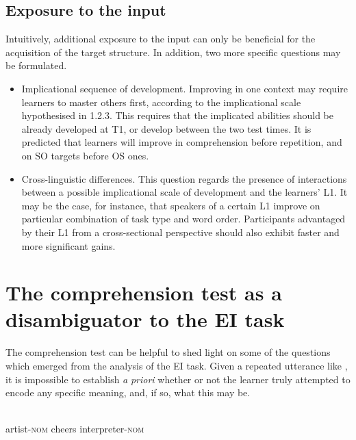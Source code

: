\subsection{Exposure to the input}\label{sec:06:1.5}

Intuitively, additional exposure to the input can only be beneficial for the acquisition of the target structure. In addition, two more specific questions may be formulated. 

\begin{itemize}
\item \begin{styleListParagraph}
Implicational sequence of development. Improving in one context may require learners to master others first, according to the implicational scale hypothesised in 1.2.3. This requires that the implicated abilities should be already developed at T1, or develop between the two test times. It is predicted that learners will improve in comprehension before repetition, and on SO targets before OS ones.
\end{styleListParagraph}
\item \begin{styleListParagraph}
Cross-linguistic differences. This question regards the presence of interactions between a possible implicational scale of development and the learners' L1. It may be the case, for instance, that speakers of a certain L1 improve on particular combination of task type and word order. Participants advantaged by their L1 from a cross-sectional perspective should also exhibit faster and more significant gains.
\end{styleListParagraph}
\end{itemize}

\section{The comprehension test as a disambiguator to the EI task}\label{sec:06:2}

The comprehension test can be helpful to shed light on some of the questions which emerged from the analysis of the EI task. Given a repeated utterance like , it is impossible to establish \textit{a} \textit{priori} whether or not the learner truly attempted to encode any specific meaning, and, if so, what this may be. 

\ea%
    \label{ex:06:1}
    \\
            artist-\textsc{nom}  cheers    interpreter-\textsc{nom} \\
    \z


